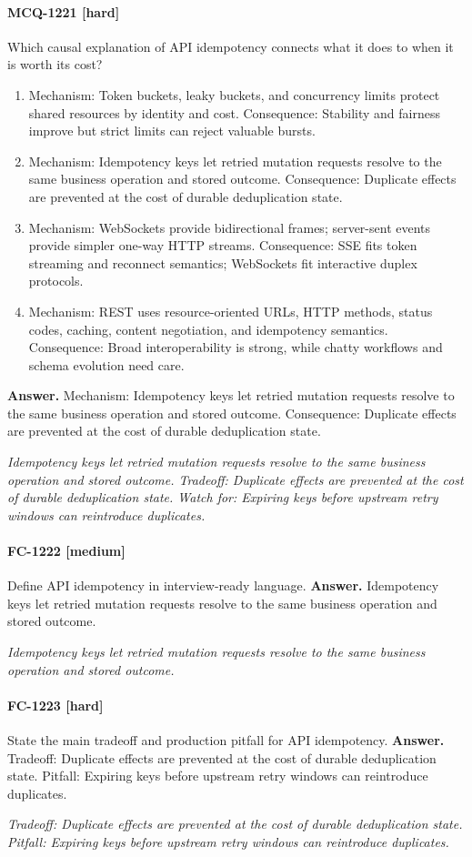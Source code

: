 \paragraph{MCQ-1221 [hard]} Which causal explanation of API idempotency connects what it does to when it is worth its cost?
\begin{enumerate}[label=\Alph*.]
\item Mechanism: Token buckets, leaky buckets, and concurrency limits protect shared resources by identity and cost. Consequence: Stability and fairness improve but strict limits can reject valuable bursts.
\item Mechanism: Idempotency keys let retried mutation requests resolve to the same business operation and stored outcome. Consequence: Duplicate effects are prevented at the cost of durable deduplication state.
\item Mechanism: WebSockets provide bidirectional frames; server-sent events provide simpler one-way HTTP streams. Consequence: SSE fits token streaming and reconnect semantics; WebSockets fit interactive duplex protocols.
\item Mechanism: REST uses resource-oriented URLs, HTTP methods, status codes, caching, content negotiation, and idempotency semantics. Consequence: Broad interoperability is strong, while chatty workflows and schema evolution need care.
\end{enumerate}
\noindent\textbf{Answer.} Mechanism: Idempotency keys let retried mutation requests resolve to the same business operation and stored outcome. Consequence: Duplicate effects are prevented at the cost of durable deduplication state.
\par\textit{Idempotency keys let retried mutation requests resolve to the same business operation and stored outcome. Tradeoff: Duplicate effects are prevented at the cost of durable deduplication state. Watch for: Expiring keys before upstream retry windows can reintroduce duplicates.}
\paragraph{FC-1222 [medium]} Define API idempotency in interview-ready language.
\noindent\textbf{Answer.} Idempotency keys let retried mutation requests resolve to the same business operation and stored outcome.
\par\textit{Idempotency keys let retried mutation requests resolve to the same business operation and stored outcome.}
\paragraph{FC-1223 [hard]} State the main tradeoff and production pitfall for API idempotency.
\noindent\textbf{Answer.} Tradeoff: Duplicate effects are prevented at the cost of durable deduplication state. Pitfall: Expiring keys before upstream retry windows can reintroduce duplicates.
\par\textit{Tradeoff: Duplicate effects are prevented at the cost of durable deduplication state. Pitfall: Expiring keys before upstream retry windows can reintroduce duplicates.}
